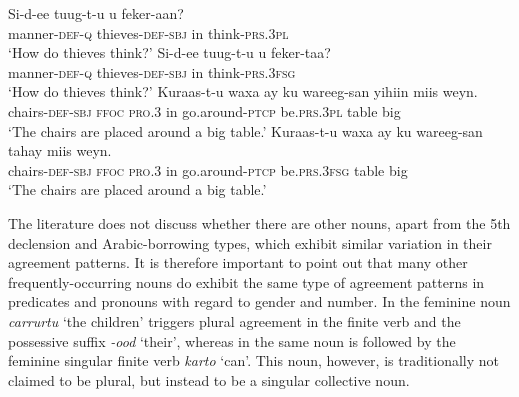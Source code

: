 \documentclass[output=paper]{langsci/langscibook}
\begin{document}
\ea
\ea
\gll Si-d-ee             tuug-t-u             u  feker-aan?\\
       manner-\textsc{def-q} thieves-\textsc{def-sbj} in think-\textsc{prs.3pl}\\
\glt ‘How do thieves think?’
\ex
\gll  Si-d-ee             tuug-t-u             u  feker-taa?\\
       manner-\textsc{def-q} thieves-\textsc{def-sbj} in think-\textsc{prs.3fsg}\\
\glt ‘How do thieves think?’
\ex
\gll  Kuraas-t-u      waxa  ay     ku wareeg-san       yihiin         miis weyn.\\
       chairs-\textsc{def-sbj} \textsc{ffoc} \textsc{pro.3} in go.around\textsc{-ptcp} be\textsc{.prs.3pl} table big\\
\glt ‘The chairs are placed around a big table.’ 
\ex
\gll  Kuraas-t-u      waxa  ay     ku wareeg-san       tahay           miis weyn.\\
       chairs-\textsc{def-sbj} \textsc{ffoc} \textsc{pro.3} in go.around\textsc{-ptcp} be\textsc{.prs.3fsg} table big\\
\glt ‘The chairs are placed around a big table.’ 
\z
\z

The literature does not discuss whether there are other nouns, apart from the 5th declension and Arabic-borrowing types, which exhibit similar variation in their agreement patterns. It is therefore important to point out that many other frequently-occurring nouns do exhibit the same type of agreement patterns in predicates and pronouns with regard to gender and number. In  the feminine noun \textit{carrurtu} ‘the children’ triggers plural agreement in the finite verb and the possessive suffix \textit{-ood} ‘their’, whereas in  the same noun is followed by the feminine singular finite verb \textit{karto} ‘can’. This noun, however, is traditionally not claimed to be plural, but instead to be a singular collective noun.
\end{document}
